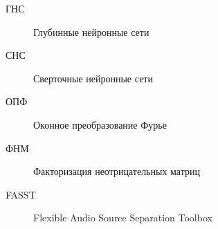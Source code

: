 \Abbreviations %
\begin{description}
\item[ГНС] Глубинные нейронные сети
\item[СНС] Сверточные нейронные сети
\item[ОПФ] Оконное преобразование Фурье
\item[ФНМ] Факторизация неотрицательных матриц
\item[FASST] Flexible Audio Source Separation Toolbox
\end{description}

